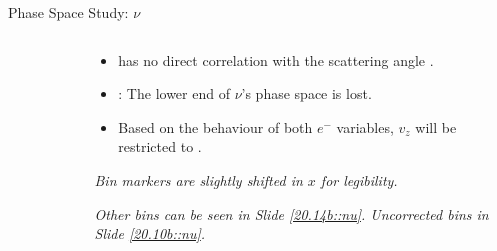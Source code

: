\begin{frame}{Phase Space Study: $\nu$}
    \label{12.13::nu}

    \begin{columns}[onlytextwidth,T]

    \begin{column}{.48\linewidth}
        \vspace{-15pt}
        \begin{center}
            \begin{figure}[t]
            \end{figure}
        \end{center}
    \end{column}

    \begin{column}{.50\linewidth}
        \begin{itemize}
            \item
                \ef{$\nu$} has no direct correlation with the scattering angle .

            \vspace{12pt}
            \item
                : The lower end of $\nu$'s phase space is lost.

            \vspace{12pt}
            \item
                Based on the behaviour of both $e^-$ variables, $v_z$ will be restricted to .
        \end{itemize}

        \vspace{66pt}

        \begin{flushright}
            \tiny{\textit{Bin markers are slightly shifted in $x$ for legibility.}}

            \tiny{\textit{
                Other bins can be seen in Slide \textcolor{efd_purple}{\ref{20.14b::nu}}.
                Uncorrected bins in Slide \textcolor{efd_purple}{\ref{20.10b::nu}}.
            }}
        \end{flushright}
    \end{column}

    \end{columns}
\end{frame}

